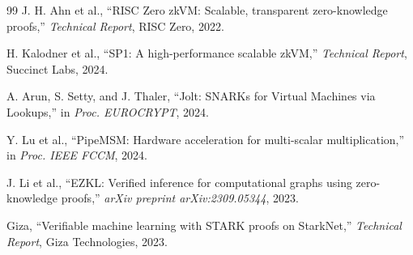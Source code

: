 \documentclass[10pt,conference]{IEEEtran}
\begin{document}
\begin{thebibliography}{99}
J. H. Ahn et al., ``RISC Zero zkVM: Scalable, transparent zero-knowledge proofs,'' \textit{Technical Report}, RISC Zero, 2022.

H. Kalodner et al., ``SP1: A high-performance scalable zkVM,'' \textit{Technical Report}, Succinct Labs, 2024.

A. Arun, S. Setty, and J. Thaler, ``Jolt: SNARKs for Virtual Machines via Lookups,'' in \textit{Proc. EUROCRYPT}, 2024.

Y. Lu et al., ``PipeMSM: Hardware acceleration for multi-scalar multiplication,'' in \textit{Proc. IEEE FCCM}, 2024.

J. Li et al., ``EZKL: Verified inference for computational graphs using zero-knowledge proofs,'' \textit{arXiv preprint arXiv:2309.05344}, 2023.

Giza, ``Verifiable machine learning with STARK proofs on StarkNet,'' \textit{Technical Report}, Giza Technologies, 2023.

\balance
\end{thebibliography}
\end{document}
